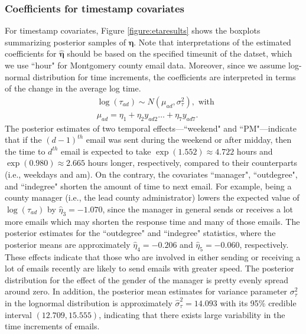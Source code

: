 \documentclass[ba]{imsart}
\numberwithin{equation}{section}
\theoremstyle{plain}
\begin{document}
	\subsubsection{Coefficients for timestamp covariates}
	For timestamp covariates, Figure \ref{figure:etaresults} shows the boxplots summarizing posterior samples of $\boldsymbol{\eta}$. Note that interpretations of the estimated coefficients for $\hat{\boldsymbol{\eta}}$ should be based on the specified timeunit of the datset, which we use ``hour" for Montgomery county email data. Moreover, since we assume log-normal distribution for time increments, the coefficients are interpreted in terms of the change in the average log time.
	\begin{equation*}
		\begin{aligned}
			&\log(\tau_{ad}) \sim N(\mu_{ad}, \sigma_\tau^2), \mbox{ with }\\
			&\mu_{ad} = \eta_{1}+\eta_{2} y_{ad2}\ldots+\eta_{7}y_{ad7}.
		\end{aligned}
	\end{equation*}
	The posterior estimates of two temporal effects---``weekend" and ``PM"---indicate that if the ${(d-1)}^{th}$ email was sent during the weekend or after midday, then the time to $d^{th}$ email is expected to take $\exp(1.552)\approx 4.722$ hours and $\exp(0.980)\approx2.665$ hours longer, respectively, compared to their counterparts (i.e., weekdays and am). On the contrary, the covariates ``manager", ``outdegree", and ``indegree"  shorten the amount of time to next email. For example, being a county manager (i.e., the lead county administrator) lowers the expected value of $\log(\tau_{ad})$ by $\hat{\eta}_3 = -1.070$, since the manager in general sends or receives a lot more emails which may shorten the response time and many of those emails. The posterior estimates for the  ``outdegree" and ``indegree" statistics, where the posterior means are approximately $\hat{\eta}_4=-0.206$ and $\hat{\eta}_5=-0.060$, respectively. These effects indicate that those who are involved in either sending or receiving a lot of emails recently are likely to send emails with greater speed. The posterior distribution for the effect of the gender of the manager is pretty evenly spread around zero. In addition, the posterior mean estimates for variance parameter $\sigma^2_\tau$ in the lognormal distribution is approximately $\hat{\sigma}^2_\tau=14.093$ with its 95\% credible interval $(12.709, 15.555)$, indicating that there exists large variability in the time increments of emails.
\end{document}

